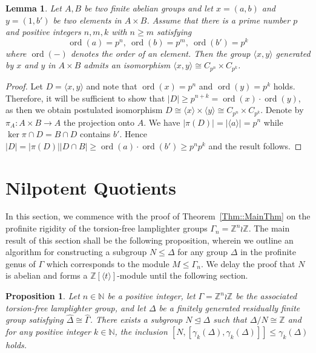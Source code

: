 \documentclass{amsart}
\numberwithin{theorem}{section}
\numberwithin{equation}{section}
\newtheorem{lemma}[theorem]{Lemma}
\newtheorem{proposition}[theorem]{Proposition}
\newcommand{\Z}{\mathbb{Z}}
\newcommand{\hD}{\widehat{\Delta}}
\newcommand{\hG}{\widehat{\Gamma}}
\begin{document}
\begin{lemma} \label{nocyclic} Let $A,B$ be two finite abelian groups and let $x=(a,b)$ and $y=(1,b')$ be two elements in $A \times B$. Assume that there is a prime number $p$ and positive integers $n,m,k$ with $n \geq m$ satisfying
\[
\operatorname{ord}(a)=p^n, \ \operatorname{ord}(b)=p^m, \ \operatorname{ord}(b')=p^k
\]
where $\operatorname{ord}(-)$ denotes the order of an element. Then the group $\langle x,y \rangle$ generated by $x$ and $y$ in $A \times B$ admits an isomorphism $\langle x,y \rangle \cong C_{p^n} \times C_{p^k}$.
\end{lemma}
\begin{proof} Let $D= \langle x,y\rangle$ and note that $\operatorname{ord}(x)=p^n$ and $ \operatorname{ord}(y)=p^k$ holds. Therefore, it will be sufficient to show that $|D| \geq p^{n+k}=\operatorname{ord}(x) \cdot \operatorname{ord}(y)$, as then we obtain postulated isomorphism $D \cong \langle x \rangle  \times \langle y \rangle \cong C_{p^n} \times C_{p^k}$.
Denote by $\pi_A: A \times B \rightarrow A$ the projection onto $A$. We have $|\pi(D)|=|\langle a \rangle|=p^n$ while $\ker \pi \cap D= B \cap D$ contains $b'$. Hence $|D| = |\pi(D)| | D \cap B| \geq \operatorname{ord}(a) \cdot \operatorname{ord}(b') \geq p^n p^k$ and the result follows.
\end{proof}

\section{Nilpotent Quotients}\label{Sec::Nilpotent}

In this section, we commence with the proof of Theorem~\ref{Thm::MainThm} on the profinite rigidity of the torsion-free lamplighter groups $\Gamma_n = \Z^n \wr \Z$. The main result of this section shall be the following proposition, wherein we outline an algorithm for constructing a subgroup $N \leq \Delta$ for any group $\Delta$ in the profinite genus of $\Gamma$ which corresponds to the module $M \leq \Gamma_n$. We delay the proof that $N$ is abelian and forms a $\Z[\langle t \rangle]$-module until the following section.
\begin{proposition} \label{nilq}
    Let $n \in \mathbb{N}$ be a positive integer, let $\Gamma = \Z^n \wr \Z$ be the associated torsion-free lamplighter group, and let $\Delta$ be a finitely generated residually finite group satisfying $\hD \cong \hG$. There exists a subgroup $N \trianglelefteq \Delta$ such that $\Delta / N \cong \Z$ and for any positive integer $k \in \mathbb{N}$, the inclusion $[N,[\gamma_k(\Delta),\gamma_k(\Delta)]] \leq \gamma_k(\Delta)$ holds.
\end{proposition}
\end{document}
